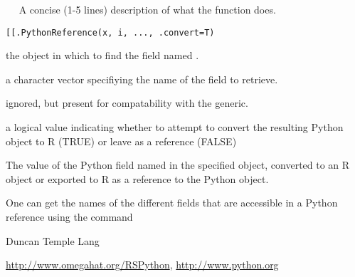 \Header{[[.PythonReference}{~~function to do ... ~~}
\keyword{~kwd1}{[[.PythonReference}
\keyword{~kwd2}{[[.PythonReference}
\begin{Description}\relax
~~ A concise (1-5 lines) description of what the function does. ~~\end{Description}
\begin{Usage}
\begin{verbatim}
[[.PythonReference(x, i, ..., .convert=T)
\end{verbatim}
\end{Usage}
\begin{Arguments}
\begin{ldescription}
\item[\code{x}] the  object in which to find the field
named .
\item[\code{i}] a character vector specifiying the name of the field to retrieve.
\item[\code{...}] ignored, but present for compatability with the generic.
\item[\code{.convert}] a logical value indicating whether to attempt to
convert the resulting Python object to R (TRUE) or leave as a reference (FALSE)
\end{ldescription}
\end{Arguments}
\begin{Value}
The value of the Python field
named  in the specified object,
converted to an R object or exported to
R as a reference to the Python object.\end{Value}
\begin{Note}\relax
One can get the names of the different
fields that are accessible in a Python reference
 using the command
\end{Note}
\begin{Author}\relax
Duncan Temple Lang\end{Author}
\begin{References}\relax
\url{http://www.omegahat.org/RSPython},
\url{http://www.python.org}\end{References}
\begin{SeeAlso}\relax
{}\end{SeeAlso}
\begin{Examples}
\end{Examples}

